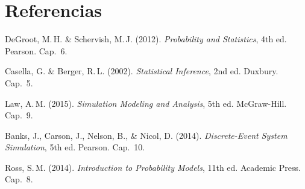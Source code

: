 \documentclass[11pt, letterpaper]{article}
\begin{document}
\section*{Referencias}
\begin{enumerate}[label={[\arabic*]}]
    \item DeGroot, M.\,H. \& Schervish, M.\,J. (2012). \textit{Probability and Statistics}, 4th ed. Pearson. Cap.~6.
    \item Casella, G. \& Berger, R.\,L. (2002). \textit{Statistical Inference}, 2nd ed. Duxbury. Cap.~5.
    \item Law, A.\,M. (2015). \textit{Simulation Modeling and Analysis}, 5th ed. McGraw-Hill. Cap.~9.
    \item Banks, J., Carson, J., Nelson, B., \& Nicol, D. (2014). \textit{Discrete-Event System Simulation}, 5th ed. Pearson. Cap.~10.
    \item Ross, S.\,M. (2014). \textit{Introduction to Probability Models}, 11th ed. Academic Press. Cap.~8.
\end{enumerate}
\end{document}

